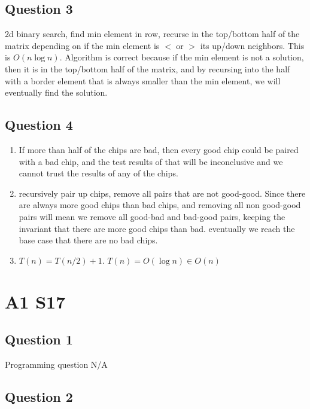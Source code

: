 \documentclass[11pt]{article}
\begin{document}
\subsection{Question 3}

2d binary search, find min element in row, recurse in the top/bottom half of the matrix depending on if the min element is $<$ or $>$ its up/down neighbors. This is $O(n \log n)$. Algorithm is correct because if the min element is not a solution, then it is in the top/bottom half of the matrix, and by recursing into the half with a border element that is always smaller than the min element, we will eventually find the solution.

\subsection{Question 4}

\begin{enumerate}
    \item If more than half of the chips are bad, then every good chip could be paired with a bad chip, and the test results of that will be inconclusive and we cannot trust the results of any of the chips.
    \item recursively pair up chips, remove all pairs that are not good-good. Since there are always more good chips than bad chips, and removing all non good-good pairs will mean we remove all good-bad and bad-good pairs, keeping the invariant that there are more good chips than bad. eventually we reach the base case that there are no bad chips.
    \item $T(n) = T(n/2) + 1$. $T(n) = O(\log n) \in O(n)$
\end{enumerate}

\section{A1 S17}

\subsection{Question 1}

Programming question N/A

\subsection{Question 2}
\end{document}
